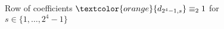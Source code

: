 
\begin{figure}[p]

    \noindent{}

    \captionsetup{singlelinecheck=off}
    \caption[.]{Row of coefficients $\textcolor{orange}{d_{2^{4}-1,s}} \equiv_{2} 1$ 
        for $s\in\lbrace1,\ldots,2^{4}-1 \rbrace$ }

    \label{fig:catalan-odd-row}

\end{figure}

